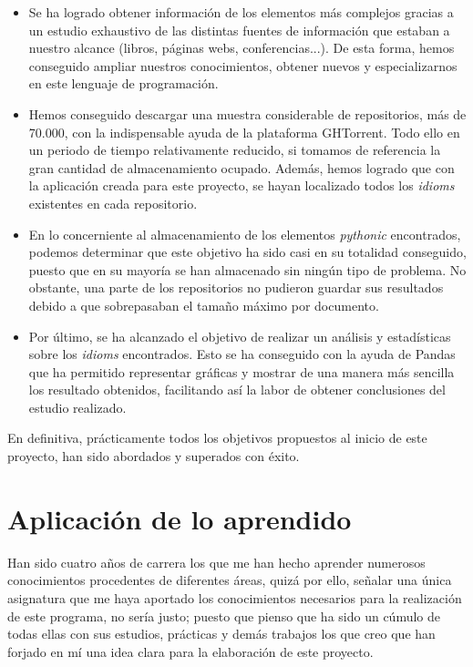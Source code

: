 \documentclass[a4paper, 12pt]{book}
\begin{document}
\begin{itemize}
\item Se ha logrado obtener información de los elementos más complejos gracias a un estudio exhaustivo de las distintas fuentes de información que estaban a nuestro alcance (libros, páginas webs, conferencias...). De esta forma, hemos conseguido ampliar nuestros conocimientos, obtener nuevos y especializarnos en este lenguaje de programación.

\item Hemos conseguido descargar una muestra considerable de repositorios, más de 70.000, con la indispensable ayuda de la plataforma GHTorrent. Todo ello en un periodo de tiempo relativamente reducido, si tomamos de referencia la gran cantidad de almacenamiento ocupado. Además, hemos logrado que con la aplicación creada para este proyecto, se hayan localizado todos los \textit{idioms} existentes en cada repositorio.

\item En lo concerniente al almacenamiento de los elementos \textit{pythonic} encontrados, podemos determinar que este objetivo ha sido casi en su totalidad conseguido, puesto que en su mayoría se han almacenado sin ningún tipo de problema. No obstante, una parte de los repositorios no pudieron guardar sus resultados debido a que sobrepasaban el tamaño máximo por documento.

\item Por último, se ha alcanzado el objetivo de realizar un análisis y estadísticas sobre los \textit{idioms} encontrados. Esto se ha conseguido con la ayuda de Pandas que ha permitido representar gráficas y mostrar de una manera más sencilla los resultado obtenidos, facilitando así la labor de obtener conclusiones del estudio realizado.

\end{itemize}

En definitiva, prácticamente todos los objetivos propuestos al inicio de este proyecto, han sido abordados y superados con éxito.

\section{Aplicación de lo aprendido}
\label{sec:aplicacion}

Han sido cuatro años de carrera los que me han hecho aprender numerosos conocimientos procedentes de diferentes áreas, quizá por ello, señalar una única asignatura que me haya aportado los conocimientos necesarios para la realización de este programa, no sería justo; puesto que pienso que ha sido un cúmulo de todas ellas con sus estudios, prácticas y demás trabajos los que creo que han forjado en mí una idea clara para la elaboración de este proyecto.
\end{document}
